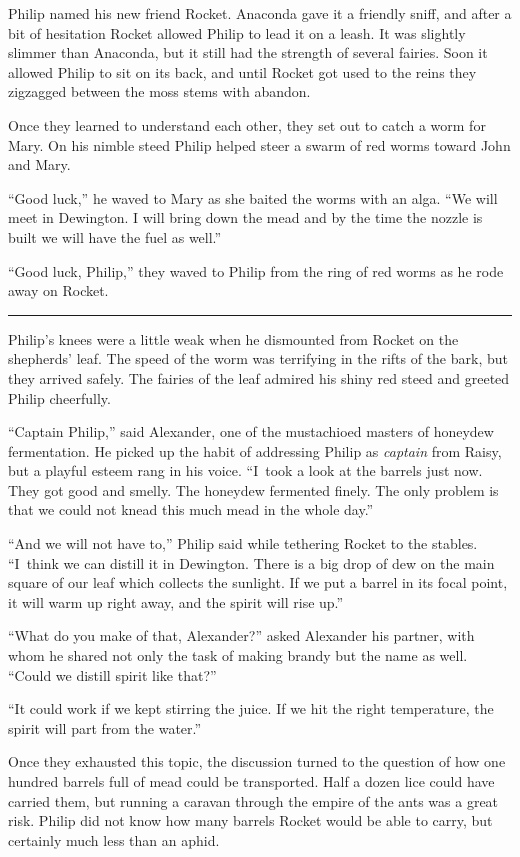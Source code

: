 \documentclass[10pt]{memoir}
\renewcommand{\pfbreakdisplay}{\bigskip \ding{166} \bigskip}
\newcommand{\secbreak}{\fancybreak{\pfbreakdisplay}}
\begin{document}
Philip named his new friend Rocket. Anaconda gave it a friendly sniff, and
after a bit of hesitation Rocket allowed Philip to lead it on a leash. It was
slightly slimmer than Anaconda, but it still had the strength of several
fairies. Soon it allowed Philip to sit on its back, and until Rocket got used
to the reins they zigzagged between the moss stems with abandon.

Once they learned to understand each other, they set out to catch a worm for
Mary. On his nimble steed Philip helped steer a swarm of red worms toward John
and Mary.

``Good luck,'' he waved to Mary as she baited the worms with an alga. ``We will
meet in Dewington. I will bring down the mead and by the time the nozzle is
built we will have the fuel as well.''

``Good luck, Philip,'' they waved to Philip from the ring of red worms as he
rode away on Rocket.

\secbreak

Philip's knees were a little weak when he dismounted from Rocket on the
shepherds' leaf. The speed of the worm was terrifying in the rifts of the bark,
but they arrived safely. The fairies of the leaf admired his shiny red steed
and greeted Philip cheerfully.

``Captain Philip,'' said Alexander, one of the mustachioed masters of honeydew
fermentation. He picked up the habit of addressing Philip as \textit{captain}
from Raisy, but a playful esteem rang in his voice. ``I~took a look at the
barrels just now. They got good and smelly. The honeydew fermented finely. The
only problem is that we could not knead this much mead in the whole day.''

``And we will not have to,'' Philip said while tethering Rocket to the stables.
``I~think we can distill it in Dewington. There is a big drop of dew on the
main square of our leaf which collects the sunlight. If we put a barrel in its
focal point, it will warm up right away, and the spirit will rise up.''

``What do you make of that, Alexander?'' asked Alexander his partner, with whom
he shared not only the task of making brandy but the name as well. ``Could we
distill spirit like that?''

``It could work if we kept stirring the juice. If we hit the right temperature,
the spirit will part from the water.''

Once they exhausted this topic, the discussion turned to the question of how
one hundred barrels full of mead could be transported. Half a dozen lice could
have carried them, but running a caravan through the empire of the ants was a
great risk. Philip did not know how many barrels Rocket would be able to carry,
but certainly much less than an aphid.
\end{document}
